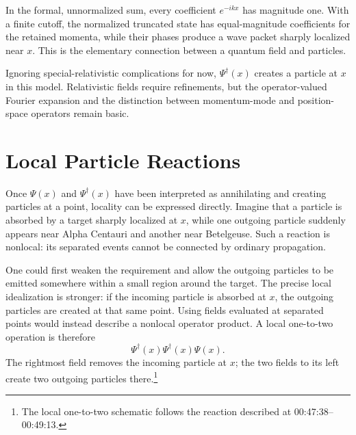 In the formal, unnormalized sum, every coefficient \(e^{-ikx}\) has magnitude one. With a finite cutoff, the normalized truncated state has equal-magnitude coefficients for the retained momenta, while their phases produce a wave packet sharply localized near \(x\). This is the elementary connection between a quantum field and particles.

Ignoring special-relativistic complications for now, \(\Psi^\dagger(x)\) creates a particle at \(x\) in this model. Relativistic fields require refinements, but the operator-valued Fourier expansion and the distinction between momentum-mode and position-space operators remain basic.

\begin{classroomqa}
\end{classroomqa}

\section{Local Particle Reactions}

Once \(\Psi(x)\) and \(\Psi^\dagger(x)\) have been interpreted as annihilating and creating particles at a point, locality can be expressed directly. Imagine that a particle is absorbed by a target sharply localized at \(x\), while one outgoing particle suddenly appears near Alpha Centauri and another near Betelgeuse. Such a reaction is nonlocal: its separated events cannot be connected by ordinary propagation.

One could first weaken the requirement and allow the outgoing particles to be emitted somewhere within a small region around the target. The precise local idealization is stronger: if the incoming particle is absorbed at \(x\), the outgoing particles are created at that same point. Using fields evaluated at separated points would instead describe a nonlocal operator product. A local one-to-two operation is therefore
\begin{equation}
\Psi^\dagger(x)\Psi^\dagger(x)\Psi(x).
\end{equation}
The rightmost field removes the incoming particle at \(x\); the two fields to its left create two outgoing particles there.\footnote{The local one-to-two schematic follows the reaction described at 00:47:38--00:49:13.}

